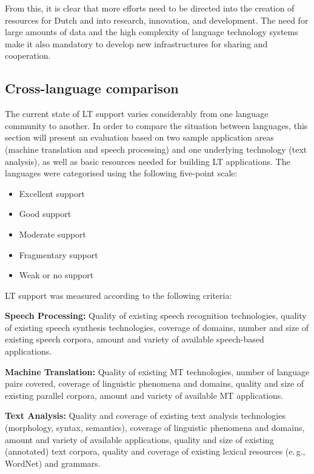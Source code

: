 \documentclass[]{../../metanetpaper}
\begin{document}
\begin{multicols}{2}
From this, it is clear that more efforts need to be directed into the creation of resources for Dutch and into research, innovation, and development. The need for large amounts of data and the high complexity of language technology systems make it also mandatory to develop new infrastructures for sharing and cooperation.

\subsection{Cross-language comparison}

The current state of LT support varies considerably from one language community to another. In order to compare the situation between languages, this section will present an evaluation based on two sample application areas (machine translation and speech processing) and one underlying technology (text analysis), as well as basic resources needed for building LT applications. The languages were categorised using the following five-point scale:

\begin{itemize}
\item Excellent support
\item Good support
\item Moderate support
\item Fragmentary support
\item Weak or no support
\end{itemize}

LT support was measured according to the following criteria:

\textbf{Speech Processing:} Quality of existing speech recognition technologies, quality of existing speech synthesis technologies, coverage of domains, number and size of existing speech corpora, amount and variety of available speech-based applications.

\textbf{Machine Translation:} Quality of existing MT technologies, number of language pairs covered, coverage of linguistic phenomena and domains, quality and size of existing parallel corpora, amount and variety of available MT applications.

\textbf{Text Analysis:} Quality and coverage of existing text analysis technologies (morphology, syntax, semantics), coverage of linguistic phenomena and domains, amount and variety of available applications, quality and size of existing (annotated) text corpora, quality and coverage of existing lexical resources (e.\,g., WordNet) and grammars.


\end{multicols}
\end{document}
